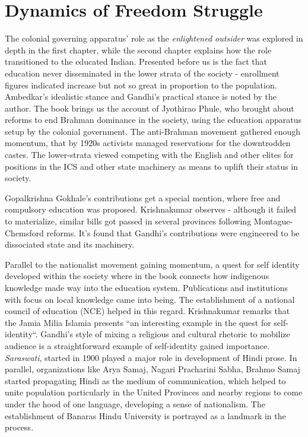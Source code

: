 \documentclass[a4paper,twocolumn]{article}
\begin{document}
\section{Dynamics of Freedom Struggle}
    The colonial governing apparatus' role as the
    \emph{enlightened outsider} was explored in depth in
    the first chapter, while the second chapter explains
    how the role transitioned to the educated Indian.
    Presented before us is the fact that education never
    disseminated in the lower strata of the society -
    enrollment figures indicated increase but not so
    great in proportion to the population. Ambedkar's
    idealistic stance and Gandhi's practical stance is
    noted by the author. The book brings us the account
    of Jyothirao Phule, who brought about reforms to end
    Brahman dominance in the society, using the
    education apparatus setup by the colonial
    government. The anti-Brahman movement gathered
    enough momentum, that by 1920s activists managed
    reservations for the downtrodden castes. The
    lower-strata viewed competing with the English and
    other elites for positions in the ICS and other
    state machinery as means to uplift their status in
    society.

    Gopalkrishna Gokhale's contributions get a special
    mention, where free and compulsory education was
    proposed. Krishnakumar observes - although it failed
    to materialize, similar bills got passed in several
    provinces following Montague-Chemsford reforms.
    It's found that Gandhi's contributions were
    engineered to be dissociated state and its
    machinery. 


    Parallel to the nationalist movement gaining
    momentum, a quest for self identity developed within
    the society where in the book connects how
    indigenous knowledge made way into the education
    system. Publications and institutions with focus on
    local knowledge came into being. The establishment
    of a national council of education (NCE) helped in
    this regard. Krishnakumar remarks that the Jamia
    Milia Islamia presents ``an interesting example in the
    quest for self-identity``. Gandhi's style of mixing a
    religious and cultural rhetoric to mobilize audience
    is a straightforward example of self-identity gained
    importance. \emph{Saraswati}, started in 1900 played
    a major role in development of Hindi prose.
    In parallel, organizations like Arya Samaj, Nagari
    Pracharini Sabha, Brahmo Samaj started propagating
    Hindi as the medium of communication, which helped
    to unite population particularly in the United
    Provinces and nearby regions to come under the hood
    of one language, developing a sense of nationalism.  
    The establishment of Banaras Hindu University is
    portrayed as a landmark in the process. 
\end{document}
